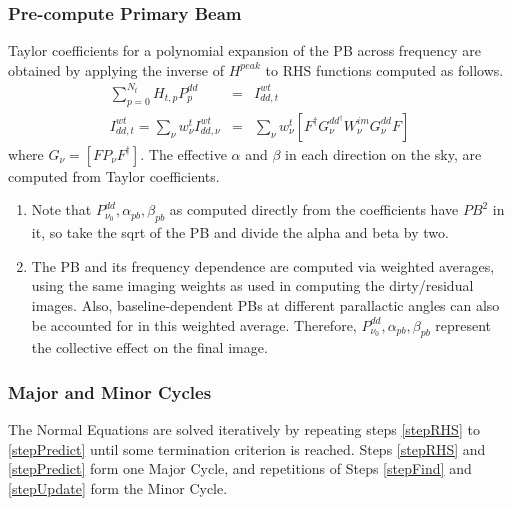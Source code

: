 \documentclass[structabstract]{aa}
\newcommand{\F}{{F}}
\newcommand{\Fd}{{F^\dag}}
\newcommand{\G}{{G}}
\newcommand{\Wimn}{{W^{im}_{\nu}}}
\newcommand{\wnt}{{w_{\nu}^t}}
\begin{document}
\subsubsection{Pre-compute Primary Beam} 
Taylor coefficients for a polynomial expansion of the PB across frequency are obtained
by applying the inverse of $H^{peak}$ to RHS functions computed as follows.
\begin{eqnarray}
\sum_{p=0}^{N_t} H_{t,p} P^{dd}_{p} &=& I^{wt}_{dd,t} \\
I^{wt}_{dd,t} = \sum_{\nu} \wnt I^{wt}_{dd,\nu} &=& \sum_{\nu} \wnt{ [\Fd \G_{\nu}^{{dd}^{\dag}} \Wimn \G_{\nu}^{dd} F] }
\end{eqnarray}
where $G_{\nu} = [\F P_{\nu} \Fd]$.
The effective $\alpha$ and $\beta$ in each direction on the sky, are computed
from Taylor coefficients. 
\begin{enumerate}
\item Note that $P^{dd}_{\nu_0},\alpha_{pb},\beta_{pb}$ as computed
directly from the coefficients have $PB^2$ in it, so take the sqrt of the PB and
divide the alpha and beta by two.
\item The PB and its frequency dependence are computed via weighted averages, using
the same imaging weights as used in computing the dirty/residual images. Also, baseline-dependent 
PBs at different parallactic angles can also be accounted for in this weighted average.
Therefore, $P^{dd}_{\nu_0},\alpha_{pb},\beta_{pb}$ represent the collective effect on the
final image.
\end{enumerate}

\subsubsection{Major and Minor Cycles}
The Normal Equations are solved iteratively by repeating steps \ref{stepRHS} to \ref{stepPredict} until 
some termination criterion is reached.
Steps \ref{stepRHS} and \ref{stepPredict} form one Major Cycle, and repetitions of Steps \ref{stepFind} and \ref{stepUpdate} form the Minor Cycle.
\end{document}
